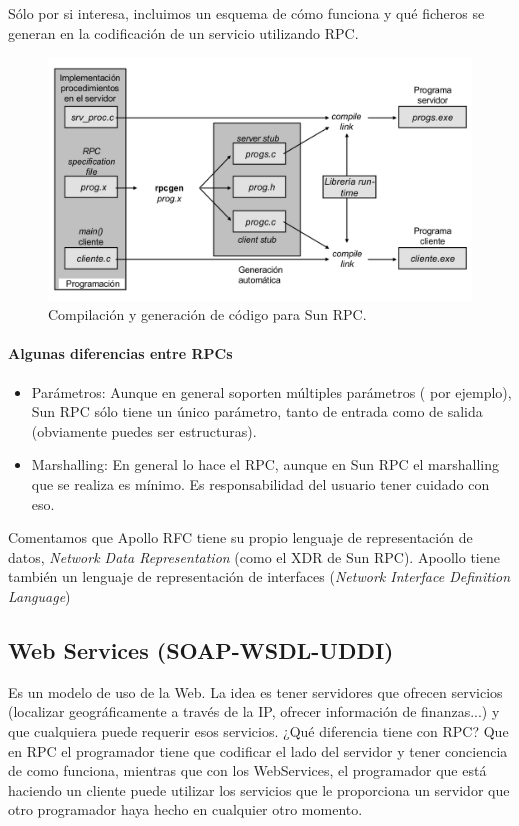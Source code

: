 \documentclass{apuntes}[nochap]
\begin{document}
Sólo por si interesa, incluimos un esquema de cómo funciona y qué ficheros se generan en la codificación de un servicio utilizando RPC.


\begin{figure}[htb]
\centering
\includegraphics[width=1\textwidth]{img/SUNRPC.png}
\caption{Compilación y generación de código para Sun RPC.}
\label{SunRPC}
\end{figure}

\paragraph{Algunas diferencias entre RPCs}
\begin{itemize}
	\item Parámetros: Aunque en general soporten múltiples parámetros ( por ejemplo), Sun RPC sólo tiene un único parámetro, tanto de entrada como de salida (obviamente puedes ser estructuras).
	\item Marshalling: En general lo hace el RPC, aunque en Sun RPC el marshalling que se realiza es mínimo. Es responsabilidad del usuario tener cuidado con eso.
\end{itemize}

Comentamos que Apollo RFC tiene su propio lenguaje de representación de datos, \textit{Network Data Representation}  (como el XDR de Sun RPC). Apoollo tiene también un lenguaje de representación de interfaces  (\textit{Network Interface Definition Language})


\subsection{Web Services (SOAP-WSDL-UDDI)}
Es un modelo de uso de la Web. La idea es tener servidores que ofrecen servicios (localizar geográficamente a través de la IP, ofrecer información de finanzas...) y que cualquiera puede requerir esos servicios. ¿Qué diferencia tiene con RPC? Que en RPC el programador tiene que codificar el lado del servidor y tener conciencia de como funciona, mientras que con los WebServices, el programador que está haciendo un cliente puede utilizar los servicios que le proporciona un servidor que otro programador haya hecho en cualquier otro momento.
\end{document}
